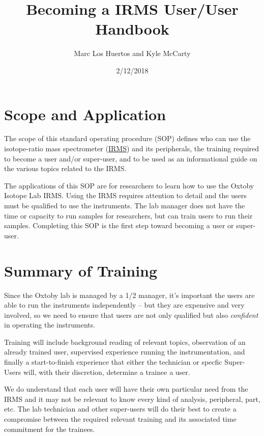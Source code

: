 \documentclass[12pt]{../SOP4_alpha}\usepackage[]{graphicx}\usepackage[]{color}
\title{Becoming a IRMS User/User Handbook}
\date{2/12/2018}
\author{Marc Los Huertos and Kyle McCarty}
\begin{document}
\maketitle

\section{Scope and Application}

\NP The scope of this standard operating procedure (SOP) defines who can use the isotope-ratio mass spectrometer (\hyperref[IRMS]{IRMS}) and its peripherals, the training required to become a user and/or super-user, and to be used as an informational guide on the various topics related to the IRMS.

\NP The applications of this SOP are for researchers to learn how to use the Oxtoby Isotope Lab IRMS. Using the IRMS requires attention to detail and the users must be qualified to use the instruments. The lab manager does not have the time or capacity to run samples for researchers, but can train users to run their samples. Completing this SOP is the first step toward becoming a user or super-user.

\section{Summary of Training}

\NP Since the Oxtoby lab is managed by a 1/2 manager, it's important the users are able to run the instruments independently -- but they are expensive and very involved, so we need to ensure that users are not only qualified but also \emph{confident} in operating the instruments.

\NP Training will include background reading of relevant topics, observation of an already trained user, supervised experience running the instrumentation, and finally a start-to-finish experience that either the technician or specfic Super-Users will, with their discretion, determine a trainee a user.

\NP We do understand that each user will have their own particular need from the IRMS and it may not be relevant to know every kind of analysis, peripheral, part, etc. The lab technician and other super-users will do their best to create a compromise between the required relevant training and its associated time commitment for the trainees.

\newpage

\tableofcontents
\end{document}
